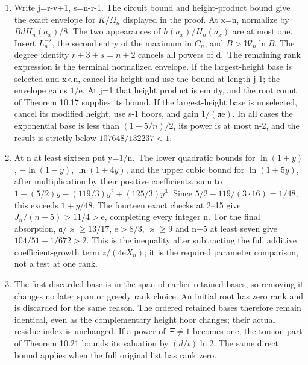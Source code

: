 \documentclass[
  11pt,
  a4paper,
]{article}
\begin{document}
\begin{enumerate}
\def\labelenumi{(\alph{enumi})}
\setcounter{enumi}{1}
\item
  Write j=r-v+1, s=n-r-1. The circuit bound and height-product bound
  give the exact envelope for \(K/\Omega_n\) displayed in the proof. At
  x=n, normalize by \(B dH_n(a_x)/8\). The two appearances of
  \(h(a_x)/H_n(a_x)\) are at most one. Insert \(L_n^{-s}\), the second
  entry of the maximum in \(C_n\), and \(B>\mathcal W_n\ln B\). The
  degree identity \(r+3+s=n+2\) cancels all powers of d.~The remaining
  rank expression is the terminal normalized envelope. If the
  largest-height base is selected and x\textless n, cancel its height
  and use the bound at length j-1; the envelope gains \(1/\mathrm e\).
  At j=1 that height product is empty, and the root count of Theorem
  10.17 supplies its bound. If the largest-height base is unselected,
  cancel its modified height, use s-1 floors, and gain
  \(1/(\mathfrak a\mathrm e)\). In all cases the exponential base is
  less than \((1+5/n)/2\), its power is at most n-2, and the result is
  strictly below \(107648/132237<1\).
\item
  At n at least sixteen put y=1/n.~The lower quadratic bounds for
  \(\ln(1+y)\), \(-\ln(1-y)\), \(\ln(1+4y)\), and the upper cubic bound
  for \(\ln(1+5y)\), after multiplication by their positive
  coefficients, sum to \(1+(5/2)y-(119/3)y^2+(125/3)y^3\). Since
  \(5/2-119/(3\cdot16)=1/48\), this exceeds \(1+y/48\). The fourteen
  exact checks at 2--15 give \(J_n/(n+5)>11/4>\mathrm e\), completing
  every integer n.~For the final absorption,
  \(\mathfrak a/\varkappa\ge13/17\), \(\mathrm e>8/3\),
  \(\varkappa\ge9\) and n+5 at least seven give \(104/51-1/672>2\). This
  is the inequality after subtracting the full additive
  coefficient-growth term \(z/(4\mathrm e X_n)\); it is the required
  parameter comparison, not a test at one rank.
\item
  The first discarded base is in the span of earlier retained bases, so
  removing it changes no later span or greedy rank choice. An initial
  root has zero rank and is discarded for the same reason. The ordered
  retained bases therefore remain identical, even as the complementary
  height floor changes; their actual residue index is unchanged. If a
  power of \(\Xi\ne1\) becomes one, the torsion part of Theorem 10.21
  bounds its valuation by \((d/t)\ln2\). The same direct bound applies
  when the full original list has rank zero.
\end{enumerate}
\end{document}
